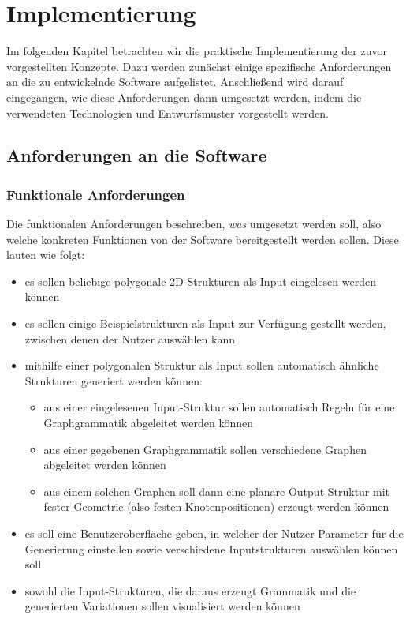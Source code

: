 %
\chapter{Implementierung}
Im folgenden Kapitel betrachten wir die praktische Implementierung der zuvor vorgestellten Konzepte. Dazu werden zunächst
einige spezifische Anforderungen an die zu entwickelnde Software aufgelistet. Anschließend wird darauf eingegangen, wie
diese Anforderungen dann umgesetzt werden, indem die verwendeten Technologien und Entwurfsmuster vorgestellt werden.

\section{Anforderungen an die Software}
\subsection{Funktionale Anforderungen}
Die funktionalen Anforderungen beschreiben, \textit{was} umgesetzt werden soll, also welche konkreten Funktionen von der Software
bereitgestellt werden sollen. Diese lauten wie folgt:

\begin{itemize}
    \item es sollen beliebige polygonale 2D-Strukturen als Input eingelesen werden können
    \item es sollen einige Beispielstrukturen als Input zur Verfügung gestellt werden, zwischen denen der Nutzer auswählen kann
    \item mithilfe einer polygonalen Struktur als Input sollen automatisch ähnliche Strukturen generiert werden können:
    \begin{itemize}
        \item aus einer eingelesenen Input-Struktur sollen automatisch Regeln für eine Graphgrammatik abgeleitet werden können
        \item aus einer gegebenen Graphgrammatik sollen verschiedene Graphen abgeleitet werden können
        \item aus einem solchen Graphen soll dann eine planare Output-Struktur mit fester Geometrie (also festen Knotenpositionen) erzeugt werden können
    \end{itemize}
    \item es soll eine Benutzeroberfläche geben, in welcher der Nutzer Parameter für die Generierung einstellen sowie verschiedene Inputstrukturen auswählen können soll
    \item sowohl die Input-Strukturen, die daraus erzeugt Grammatik und die generierten Variationen sollen visualisiert werden können
\end{itemize}

